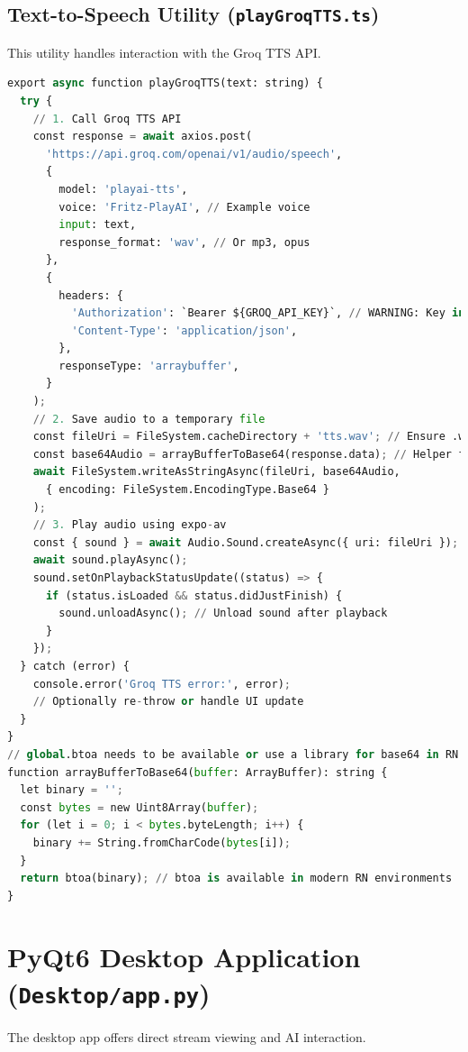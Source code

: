 \documentclass[12pt, a4paper]{report}
\begin{document}
\subsection{Text-to-Speech Utility (\texttt{playGroqTTS.ts})}
This utility handles interaction with the Groq TTS API.
\begin{lstlisting}[language=Python, caption={React Native Groq TTS Utility Snippet}, label={lst:rn_tts_ch4}] % Changed label, lang
export async function playGroqTTS(text: string) {
  try {
    // 1. Call Groq TTS API
    const response = await axios.post(
      'https://api.groq.com/openai/v1/audio/speech',
      {
        model: 'playai-tts',
        voice: 'Fritz-PlayAI', // Example voice
        input: text,
        response_format: 'wav', // Or mp3, opus
      },
      {
        headers: {
          'Authorization': `Bearer ${GROQ_API_KEY}`, // WARNING: Key in client-side code
          'Content-Type': 'application/json',
        },
        responseType: 'arraybuffer',
      }
    );
    // 2. Save audio to a temporary file
    const fileUri = FileSystem.cacheDirectory + 'tts.wav'; // Ensure .wav if format is wav
    const base64Audio = arrayBufferToBase64(response.data); // Helper function
    await FileSystem.writeAsStringAsync(fileUri, base64Audio,
      { encoding: FileSystem.EncodingType.Base64 }
    );
    // 3. Play audio using expo-av
    const { sound } = await Audio.Sound.createAsync({ uri: fileUri });
    await sound.playAsync();
    sound.setOnPlaybackStatusUpdate((status) => {
      if (status.isLoaded && status.didJustFinish) {
        sound.unloadAsync(); // Unload sound after playback
      }
    });
  } catch (error) {
    console.error('Groq TTS error:', error);
    // Optionally re-throw or handle UI update
  }
}
// global.btoa needs to be available or use a library for base64 in RN if not polyfilled
function arrayBufferToBase64(buffer: ArrayBuffer): string {
  let binary = '';
  const bytes = new Uint8Array(buffer);
  for (let i = 0; i < bytes.byteLength; i++) {
    binary += String.fromCharCode(bytes[i]);
  }
  return btoa(binary); // btoa is available in modern RN environments
}
\end{lstlisting}

\section{PyQt6 Desktop Application (\texttt{Desktop/app.py})}
The desktop app offers direct stream viewing and AI interaction.
\end{document}
